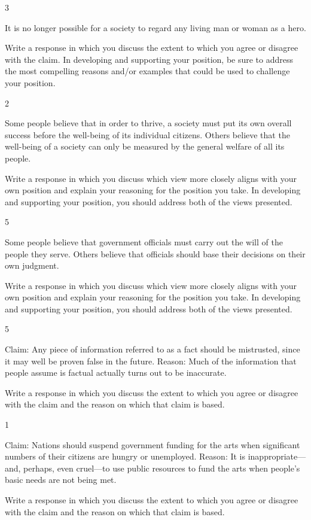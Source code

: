 \documentclass[]{article}
\begin{document}
3

It is no longer possible for a society to regard any living man or woman
as a hero.

Write a response in which you discuss the extent to which you agree or
disagree with the claim. In developing and supporting your position, be
sure to address the most compelling reasons and/or examples that could
be used to challenge your position.

2

Some people believe that in order to thrive, a society must put its own
overall success before the well-being of its individual citizens. Others
believe that the well-being of a society can only be measured by the
general welfare of all its people.

Write a response in which you discuss which view more closely aligns
with your own position and explain your reasoning for the position you
take. In developing and supporting your position, you should address
both of the views presented.

5

Some people believe that government officials must carry out the will of
the people they serve. Others believe that officials should base their
decisions on their own judgment.

Write a response in which you discuss which view more closely aligns
with your own position and explain your reasoning for the position you
take. In developing and supporting your position, you should address
both of the views presented.

5

Claim: Any piece of information referred to as a fact should be
mistrusted, since it may well be proven false in the future. Reason:
Much of the information that people assume is factual actually turns out
to be inaccurate.

Write a response in which you discuss the extent to which you agree or
disagree with the claim and the reason on which that claim is based.

1

Claim: Nations should suspend government funding for the arts when
significant numbers of their citizens are hungry or unemployed. Reason:
It is inappropriate---and, perhaps, even cruel---to use public resources
to fund the arts when people's basic needs are not being met.

Write a response in which you discuss the extent to which you agree or
disagree with the claim and the reason on which that claim is based.
\end{document}
